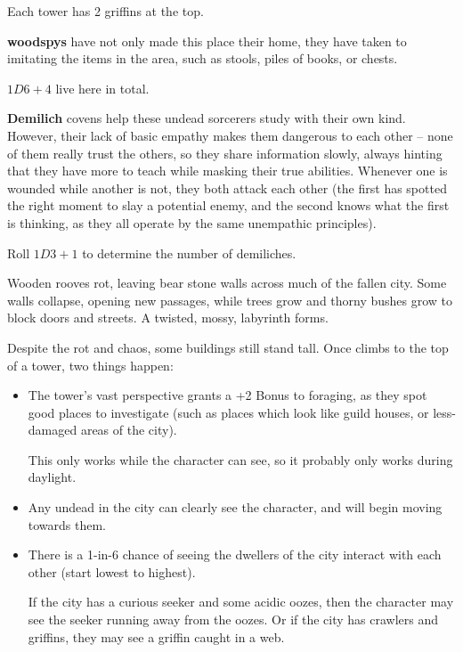 \begin{multicols}{2}
\begin{dlist}
  Each tower has 2 griffins at the top.
  \item
  \textbf{\Glspl{woodspy}} have not only made this place their home, they have taken to imitating the items in the area, such as stools, piles of books, or chests.

  $1D6+4$ live here in total.
  \item\label{lostDemilich}
  \textbf{Demilich} covens help these undead sorcerers study with their own kind.
  However, their lack of basic empathy makes them dangerous to each other -- none of them really trust the others, so they share information slowly, always hinting that they have more to teach while masking their true abilities.
  Whenever one is wounded while another is not, they both attack each other (the first has spotted the right moment to slay a potential enemy, and the second knows what the first is thinking, as they all operate by the same unempathic principles).

  Roll $1D3 + 1$ to determine the number of demiliches.
\end{dlist}

\label{lostTowers}

Wooden rooves rot, leaving bear stone walls across much of the fallen city.
Some walls collapse, opening new passages, while trees grow and thorny bushes grow to block doors and streets.
A twisted, mossy, labyrinth forms.

Despite the rot and chaos, some buildings still stand tall.
Once  climbs to the top of a tower, two things happen:


\begin{itemize}
  \item
  The tower's vast perspective grants a +2 Bonus to foraging, as they spot good places to investigate (such as places which look like guild houses, or less-damaged areas of the city).

  This only works while the character can see, so it probably only works during daylight.
  \item
  Any undead in the city can clearly see the character, and will begin moving towards them.
  \item
  There is a 1-in-6 chance of seeing the dwellers of the city interact with each other (start lowest to highest).

  If the city has a curious \gls{seeker} and some acidic oozes, then the character may see the \gls{seeker} running away from the oozes.
  Or if the city has \glspl{crawler} and griffins, they may see a griffin caught in a web.
\end{itemize}


\end{multicols}
